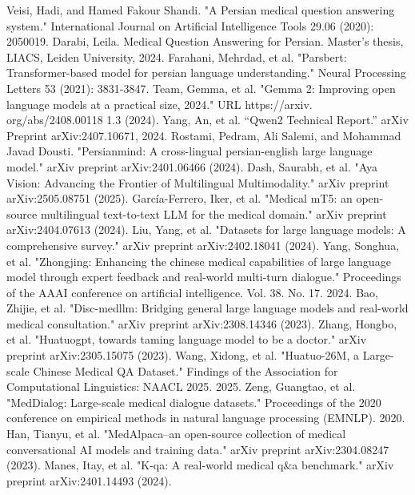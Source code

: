 \documentclass[conference]{IEEEtran}
\begin{document}
\begin{thebibliography}{00}
		Veisi, Hadi, and Hamed Fakour Shandi. "A Persian medical question answering system." International Journal on Artificial Intelligence Tools 29.06 (2020): 2050019. 
		Darabi, Leila. Medical Question Answering for Persian. Master’s thesis, LIACS, Leiden University, 2024.
		Farahani, Mehrdad, et al. "Parsbert: Transformer-based model for persian language understanding." Neural Processing Letters 53 (2021): 3831-3847.
		Team, Gemma, et al. "Gemma 2: Improving open language models at a practical size, 2024." URL https://arxiv. org/abs/2408.00118 1.3 (2024).
		Yang, An, et al. “Qwen2 Technical Report.” arXiv Preprint arXiv:2407.10671, 2024.
		Rostami, Pedram, Ali Salemi, and Mohammad Javad Dousti. "Persianmind: A cross-lingual persian-english large language model." arXiv preprint arXiv:2401.06466 (2024).
		Dash, Saurabh, et al. "Aya Vision: Advancing the Frontier of Multilingual Multimodality." arXiv preprint arXiv:2505.08751 (2025).
		García-Ferrero, Iker, et al. "Medical mT5: an open-source multilingual text-to-text LLM for the medical domain." arXiv preprint arXiv:2404.07613 (2024).
		Liu, Yang, et al. "Datasets for large language models: A comprehensive survey." arXiv preprint arXiv:2402.18041 (2024).
		Yang, Songhua, et al. "Zhongjing: Enhancing the chinese medical capabilities of large language model through expert feedback and real-world multi-turn dialogue." Proceedings of the AAAI conference on artificial intelligence. Vol. 38. No. 17. 2024.
		Bao, Zhijie, et al. "Disc-medllm: Bridging general large language models and real-world medical consultation." arXiv preprint arXiv:2308.14346 (2023).
		Zhang, Hongbo, et al. "Huatuogpt, towards taming language model to be a doctor." arXiv preprint arXiv:2305.15075 (2023).
		Wang, Xidong, et al. "Huatuo-26M, a Large-scale Chinese Medical QA Dataset." Findings of the Association for Computational Linguistics: NAACL 2025. 2025.
		Zeng, Guangtao, et al. "MedDialog: Large-scale medical dialogue datasets." Proceedings of the 2020 conference on empirical methods in natural language processing (EMNLP). 2020.
		Han, Tianyu, et al. "MedAlpaca--an open-source collection of medical conversational AI models and training data." arXiv preprint arXiv:2304.08247 (2023).
		Manes, Itay, et al. "K-qa: A real-world medical q\&a benchmark." arXiv preprint arXiv:2401.14493 (2024).

\end{thebibliography}
\end{document}
